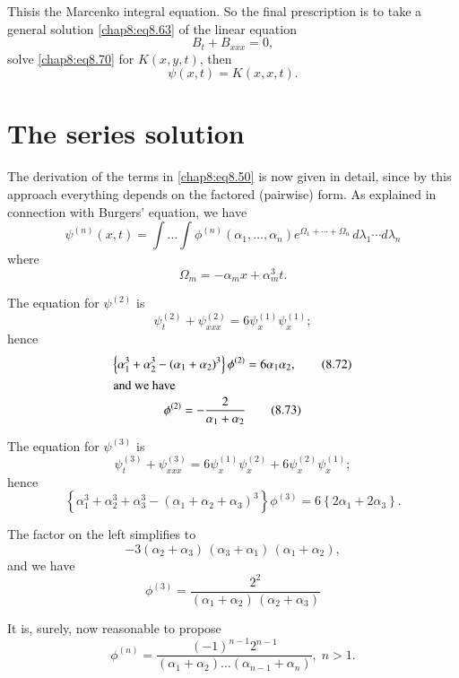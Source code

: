 This\pageoriginale is the Marcenko integral equation. So the final prescription is to take a general solution \eqref{chap8:eq8.63} of the linear equation 
$$
B_t+B_{xxx}=0,
$$
solve \eqref{chap8:eq8.70} for $K(x,y,t)$, then
$$
\psi(x,t)=K(x,x,t).
$$

\section{The series solution}\label{chap8:sec8.7}

The derivation of the terms in \eqref{chap8:eq8.50} is now given in detail, since by this approach everything depends on the factored (pairwise) form. As explained in connection with Burgers' equation, we have 
\begin{equation}
\psi^{(n)}(x,t)=\int\ldots\int\phi^{(n)}\left(\alpha_1,\ldots,\alpha_n\right) e^{\Omega_1+\cdots+\Omega_n}\,d\lambda_1\cdots d\lambda_n \tag{8.71}\label{chap8:eq8.71}
\end{equation}
where
$$
\Omega_m=-\alpha_mx+\alpha_m^3 t.
$$

The equation for $\psi^{(2)}$ is 
$$
\psi_t^{(2)}+\psi_{xxx}^{(2)}=6\psi_x^{(1)}\psi_x^{(1)};
$$
hence
\begin{gather}
\left\{\alpha_1^3+\alpha_2^3-\left(\alpha_1+\alpha_2\right)^3\right\}\phi^{(2)}= 6\alpha_1\alpha_2,\tag{8.72}\label{chap8:eq8.72}\\
\intertext{and we have}
\phi^{(2)}=-\frac{2}{\alpha_1+\alpha_2}\tag{8.73}\label{chap8:eq8.73}
\end{gather}

The equation for $\psi^{(3)}$ is 
$$
\psi_t^{(3)}+\psi_{xxx}^{(3)}=6\psi_x^{(1)}\psi_x^{(2)}+6\psi_x^{(2)} \psi_x^{(1)};
$$
hence\pageoriginale
\begin{equation}
\left\{\alpha_1^3+\alpha_2^3+\alpha_3^3-\left(\alpha_1+\alpha_2+\alpha_3\right)^3 \right\}\phi^{(3)}=6\left\{2\alpha_1+2\alpha_3\right\}. \tag{8.74}\label{chap8:eq8.74}
\end{equation}

The factor on the left simplifies to 
$$
-3\left(\alpha_2+\alpha_3\right)\,\left(\alpha_3+\alpha_1\right)\,\left(\alpha_1 +\alpha_2\right),
$$
and we have
\begin{equation}
\phi^{(3)} =\frac{2^2}{\left(\alpha_1+\alpha_2\right)\,\left(\alpha_2+\alpha_3\right)} \tag{8.75}\label{chap8:eq8.75}
\end{equation}

It is, surely, now reasonable to propose
\begin{equation}
\phi^{(n)}=\frac{(-1)^{n-1}2^{n-1}}{\left(\alpha_1+\alpha_2\right)\ldots \left( \alpha_{n-1}+\alpha_n\right)},\;n>1.\tag{8.76}\label{chap8:eq8.76}
\end{equation}

